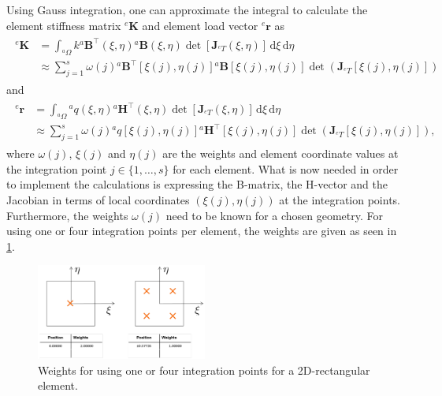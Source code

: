 \documentclass[a4paper,11pt]{article}
\numberwithin{equation}{section}
\newcommand\matr[1]{\ensuremath{\boldsymbol{\mathbf{#1}}}}
\newcommand\vect[1]{\ensuremath{\bm{#1}}}
\begin{document}
{Using Gauss integration, one can approximate the integral to calculate the element stiffness matrix ${}^e \matr{K}$ and element load vector ${}^e \vect{r}$ as \begin{align}\begin{aligned}
		{}^e \matr{K}& = \int_{{}^a\Omega} k {}^a \matr{B}^\top(\xi,\eta) {}^a \matr{B}(\xi,\eta) \det\left[\matr{J}_{{}^e T}(\xi,\eta)\right]\,\mathrm{d}\xi\,\mathrm{d}\eta \\
		&\approx \sum_{j=1}^{s}\omega(j){}^a\matr{B}^\top[\xi(j),\eta(j)]  {}^a\matr{B}[\xi(j),\eta(j)] \det\left(\matr{J}_{{}^e T}[\xi(j),\eta(j)]\right)
\end{aligned}\end{align} and
\begin{align}
	\begin{aligned}
		{}^e \vect{r} &= \int_{{}^a\Omega} {}^a q(\xi,\eta) {}^a\vect{H}^\top(\xi,\eta) \det\left[\matr{J}_{{}^e T}(\xi,\eta)\right]\,\mathrm{d}\xi\,\mathrm{d}\eta \\
		&\approx \sum_{j=1}^{s}\omega(j){}^aq\left[\xi(j),\eta(j)\right]{}^a\vect{H}^\top [\xi(j),\eta(j)] \det\left(\matr{J}_{{}^e T}[\xi(j),\eta(j)]\right),
	\end{aligned}
\end{align} where $\omega(j)$, $\xi(j)$ and $\eta(j)$ are the weights and element coordinate values at the integration point $j \in\{1,\dots,s\}$ for each element. What is now needed in order to implement the calculations is expressing the B-matrix, the H-vector and the Jacobian in terms of local coordinates $(\xi(j),\eta(j))$ at the integration points. Furthermore, the weights $\omega(j)$ need to be known for a chosen geometry. For using one or four integration points per element, the weights are given as seen in \cref{fig:weights}.
\begin{figure}[h]
	\centering
	\includegraphics[width=0.5\textwidth]{figures/weights.png}
	\caption{Weights for using one or four integration points for a 2D-rectangular element.}
	\label{fig:weights}
\end{figure}

}
\end{document}
